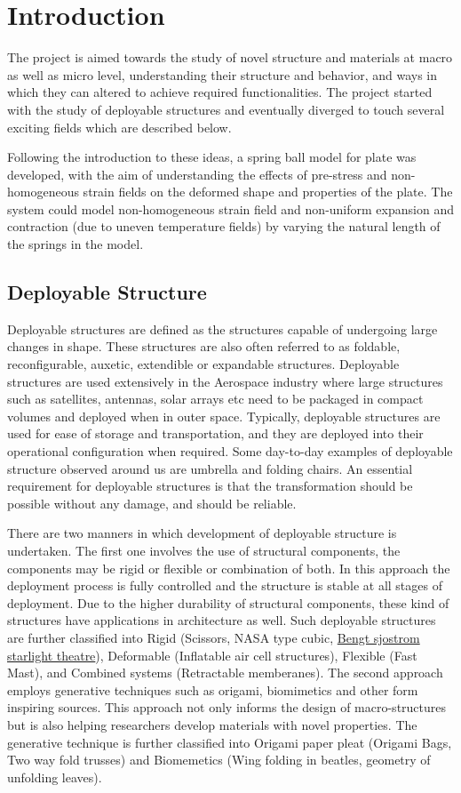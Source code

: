 \chapter{Introduction}
The project is aimed towards the study of novel structure and materials at macro as well as micro level, understanding their structure and behavior, and ways in which they can altered to achieve required functionalities. The project started with the study of deployable structures and eventually diverged to touch several exciting fields which are described below. 


Following the introduction to these ideas, a spring ball model for plate was developed, with the aim of understanding the effects of pre-stress and non-homogeneous strain fields on the deformed shape and properties of the plate. The system could model non-homogeneous strain field and non-uniform expansion and contraction (due to uneven temperature fields) by varying the natural length of the springs in the model.

\section{Deployable Structure}
Deployable structures are defined as the structures capable of undergoing large changes in shape. These structures are also often referred to as foldable, reconfigurable, auxetic, extendible or expandable structures. Deployable structures are used extensively in the Aerospace industry where large structures such as satellites, antennas, solar arrays etc need to be packaged in compact volumes and deployed when in outer space. Typically, deployable structures are used for ease of storage and transportation, and they are deployed into their operational configuration when required. Some day-to-day examples of deployable structure observed around us are umbrella and folding chairs. An essential requirement for deployable structures is that the transformation should be possible without any damage, and should be reliable.

There are two manners in which development of deployable structure is undertaken. The first one involves the use of structural components, the components may be rigid or flexible or combination of both. In this approach the deployment process is fully controlled and the structure is stable at all stages of deployment. Due to the higher durability of structural components, these kind of structures have applications in architecture as well. Such deployable structures are further classified into Rigid (Scissors, NASA type cubic, \href{https://en.wikipedia.org/wiki/Bengt_Sjostrom_Theatre}{Bengt sjostrom starlight theatre}), Deformable (Inflatable air cell structures), Flexible (Fast Mast), and Combined systems (Retractable memberanes). The second approach employs generative techniques such as origami, biomimetics and other form inspiring sources. This approach not only informs the design of macro-structures but is also helping researchers develop materials with novel properties. The generative technique is further classified into Origami paper pleat (Origami Bags, Two way fold trusses) and Biomemetics (Wing folding in beatles, geometry of unfolding leaves). \cite{rivas2015deployable} \cite{Filip} \cite{Zha}
 
